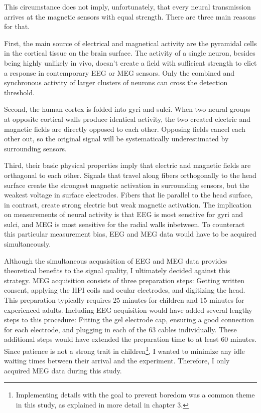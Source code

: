 This circumstance does not imply, unfortunately, that every neural transmission arrives at the magnetic sensors with equal strength.
There are three main reasons for that.

First, the main source of electrical and magnetical activity are the pyramidal cells in the cortical tissue on the brain surface.
The activity of a single neuron, besides being highly unlikely in vivo, doesn't create a field with sufficient strength to elict a response in contemporary EEG or MEG sensors.
Only the combined and synchronous activity of larger clusters of neurons can cross the detection threshold.

Second, the human cortex is folded into gyri and sulci.
When two neural groups at opposite cortical walls produce identical activity, the two created electric and magnetic fields are directly opposed to each other.
Opposing fields cancel each other out, so the original signal will be systematically underestimated by surrounding sensors.

Third, their basic physical properties imply that electric and magnetic fields are orthagonal to each other.
Signals that travel along fibers orthogonally to the head surface create the strongest magnetic activation in surrounding sensors, but the weakest voltage in surface electrodes.
Fibers that lie parallel to the head surface, in contrast, create strong electric but weak magnetic activation.
The implication on measurements of neural activity is that EEG is most sensitive for gyri and sulci, and MEG is most sensitive for the radial walls inbetween.
To counteract this particular measurement bias, EEG and MEG data would have to be acquired simultaneously.

Although the simultaneous acqusisition of EEG and MEG data provides theoretical benefits to the signal quality, I ultimately decided against this strategy.
MEG acquisition consists of three preparation steps: Getting written consent, applying the HPI coils and ocular electrodes, and digitizing the head.
This preparation typically requires 25 minutes for children and 15 minutes for experienced adults.
Including EEG acquisition would have added several lengthy steps to this procedure: Fitting the gel electrode cap, ensuring a good connection for each electrode, and plugging in each of the 63 cables individually.
These additional steps would have extended the preparation time to at least 60 minutes.
Since patience is not a strong trait in children\footnote{Implementing details with the goal to prevent boredom was a common theme in this study, as explained in more detail in chapter 3.}, I wanted to minimize any idle waiting times between their arrival and the experiment.
Therefore, I only acquired MEG data during this study.

